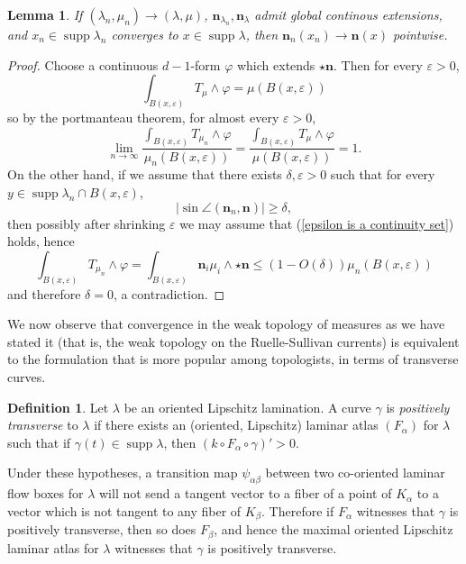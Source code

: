 \documentclass[reqno,11pt]{amsart}
\DeclareMathOperator{\supp}{supp}
\newcommand{\normal}{\mathbf n}
\newcommand{\dfn}[1]{\emph{#1}\index{#1}}
\newtheorem{lemma}[theorem]{Lemma}
\theoremstyle{definition}
\newtheorem{definition}[theorem]{Definition}
\numberwithin{equation}{section}
\begin{document}
\begin{lemma}\label{convergence of normals}
If $(\lambda_n, \mu_n) \to (\lambda, \mu)$, $\normal_{\lambda_n}, \normal_\lambda$ admit global continous extensions, and $x_n \in \supp \lambda_n$ converges to $x \in \supp \lambda$, then $\normal_n(x_n) \to \normal(x)$ pointwise.
\end{lemma}
\begin{proof}
	Choose a continuous $d-1$-form $\varphi$ which extends $\star \normal$.
	Then for every $\varepsilon > 0$,
	$$\int_{B(x, \varepsilon)} T_\mu \wedge \varphi = \mu(B(x, \varepsilon))$$
	so by the portmanteau theorem, for almost every $\varepsilon > 0$,
	\begin{equation}\label{epsilon is a continuity set}
		\lim_{n \to \infty} \frac{\int_{B(x, \varepsilon)} T_{\mu_n} \wedge \varphi}{\mu_n(B(x, \varepsilon))} = \frac{\int_{B(x, \varepsilon)} T_\mu \wedge \varphi}{\mu(B(x, \varepsilon))} = 1.
	\end{equation}
	On the other hand, if we assume that there exists $\delta, \varepsilon > 0$ such that for every $y \in \supp \lambda_n \cap B(x, \varepsilon)$,
	$$|\sin \angle(\normal_n, \normal)| \geq \delta,$$
	then possibly after shrinking $\varepsilon$ we may assume that (\ref{epsilon is a continuity set}) holds, hence
	$$\int_{B(x, \varepsilon)} T_{\mu_n} \wedge \varphi = \int_{B(x, \varepsilon)} \normal_i\mu_i \wedge \star \normal \leq (1 - O(\delta)) \mu_n(B(x, \varepsilon))$$
	and therefore $\delta = 0$, a contradiction.
\end{proof}

We now observe that convergence in the weak topology of measures as we have stated it (that is, the weak topology on the Ruelle-Sullivan currents) is equivalent to the formulation that is more popular among topologists, in terms of transverse curves.

\begin{definition}
	Let $\lambda$ be an oriented Lipschitz lamination. A curve $\gamma$ is \dfn{positively transverse} to $\lambda$ if there exists an (oriented, Lipschitz) laminar atlas $(F_\alpha)$ for $\lambda$ such that if $\gamma(t) \in \supp \lambda$, then $(k \circ F_\alpha \circ \gamma)' > 0$.
\end{definition}

Under these hypotheses, a transition map $\psi_{\alpha \beta}$ between two co-oriented laminar flow boxes for $\lambda$ will not send a tangent vector to a fiber of a point of $K_\alpha$ to a vector which is not tangent to any fiber of $K_\beta$.
Therefore if $F_\alpha$ witnesses that $\gamma$ is positively transverse, then so does $F_\beta$, and hence the maximal oriented Lipschitz laminar atlas for $\lambda$ witnesses that $\gamma$ is positively transverse.
\end{document}
